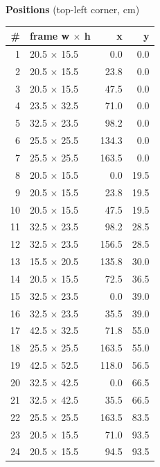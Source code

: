 \documentclass[a4paper,landscape,10pt]{article}
\begin{document}
\begin{minipage}[t]{0.25\textwidth}
\vspace{8pt}
{\bfseries Positions} (top-left corner, cm)\\[2pt]
\tiny
\begin{tabular}{@{}r l r r@{}}
\toprule
\# & frame w $\times$ h & x & y \\
\midrule
1 & 20.5 $\times$ 15.5 & 0.0 & 0.0 \\
2 & 20.5 $\times$ 15.5 & 23.8 & 0.0 \\
3 & 20.5 $\times$ 15.5 & 47.5 & 0.0 \\
4 & 23.5 $\times$ 32.5 & 71.0 & 0.0 \\
5 & 32.5 $\times$ 23.5 & 98.2 & 0.0 \\
6 & 25.5 $\times$ 25.5 & 134.3 & 0.0 \\
7 & 25.5 $\times$ 25.5 & 163.5 & 0.0 \\
8 & 20.5 $\times$ 15.5 & 0.0 & 19.5 \\
9 & 20.5 $\times$ 15.5 & 23.8 & 19.5 \\
10 & 20.5 $\times$ 15.5 & 47.5 & 19.5 \\
11 & 32.5 $\times$ 23.5 & 98.2 & 28.5 \\
12 & 32.5 $\times$ 23.5 & 156.5 & 28.5 \\
13 & 15.5 $\times$ 20.5 & 135.8 & 30.0 \\
14 & 20.5 $\times$ 15.5 & 72.5 & 36.5 \\
15 & 32.5 $\times$ 23.5 & 0.0 & 39.0 \\
16 & 32.5 $\times$ 23.5 & 35.5 & 39.0 \\
17 & 42.5 $\times$ 32.5 & 71.8 & 55.0 \\
18 & 25.5 $\times$ 25.5 & 163.5 & 55.0 \\
19 & 42.5 $\times$ 52.5 & 118.0 & 56.5 \\
20 & 32.5 $\times$ 42.5 & 0.0 & 66.5 \\
21 & 32.5 $\times$ 42.5 & 35.5 & 66.5 \\
22 & 25.5 $\times$ 25.5 & 163.5 & 83.5 \\
23 & 20.5 $\times$ 15.5 & 71.0 & 93.5 \\
24 & 20.5 $\times$ 15.5 & 94.5 & 93.5 \\
\bottomrule
\end{tabular}
\end{minipage}
\clearpage
\end{document}
